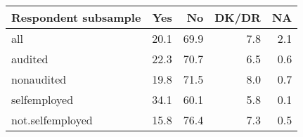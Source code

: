 \begin{table}[ht]
\centering
\begin{tabular}{lrrrr}
  \hline
Respondent subsample & Yes & No & DK/DR & NA \\ 
  \hline
all & 20.1 & 69.9 & 7.8 & 2.1 \\ 
  audited & 22.3 & 70.7 & 6.5 & 0.6 \\ 
  nonaudited & 19.8 & 71.5 & 8.0 & 0.7 \\ 
  selfemployed & 34.1 & 60.1 & 5.8 & 0.1 \\ 
  not.selfemployed & 15.8 & 76.4 & 7.3 & 0.5 \\ 
   \hline
\end{tabular}
\end{table}
